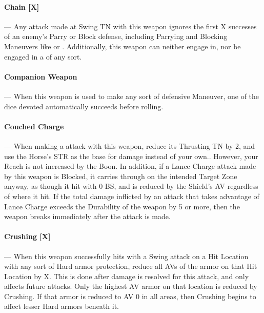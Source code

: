 \documentclass[oneside,11pt,english]{book}
\begin{document}
\vspace{-5pt}\paragraph[Chain]{\label{wepqual:Chain}Chain [X]}---\quad
Any attack made at Swing TN with this weapon ignores the first X successes of an enemy’s Parry or Block defense, including Parrying and Blocking Maneuvers like  or . Additionally, this weapon can neither engage in, nor be engaged in a  of any sort.

\vspace{-5pt}\paragraph{\label{wepqual:Companion Weapon}Companion Weapon}---\quad
When this weapon is used to make any sort of defensive Maneuver, one of the dice devoted automatically succeeds before rolling.

\vspace{-5pt}\paragraph{\label{wepqual:Couched Charge}Couched Charge}---\quad
When making a  attack with this weapon, reduce its
Thrusting TN by 2, and use the Horse’s STR as the base for damage instead of
your own.. However, your Reach is not increased by the  Boon.
In addition, if a Lance Charge attack made by this weapon is Blocked, it carries
through on the intended Target Zone anyway, as though it hit with 0 BS, and is
reduced by the Shield’s AV regardless of where it hit. If the total damage
inflicted by an attack that takes advantage of Lance Charge exceeds the
Durability of the weapon by 5 or more, then the weapon breaks immediately after
the attack is made. 

\vspace{-5pt}\paragraph[Crushing]{\label{wepqual:Crushing}Crushing [X]}---\quad
When this weapon successfully hits with a Swing attack on a Hit Location with
any sort of Hard armor protection, reduce all AVs of the armor on that Hit
Location by X. This is done after damage is resolved for this attack, and only
affects future attacks. Only the highest AV armor on that location is reduced by
Crushing. If that armor is reduced to AV 0 in all areas, then Crushing begins to
affect lesser Hard armors beneath it.  
\end{document}
